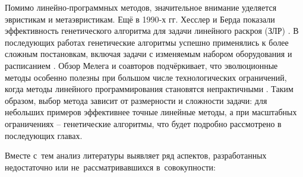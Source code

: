 Помимо линейно‑программных методов, значительное внимание уделяется эвристикам и метаэвристикам.
Ещё в 1990‑х гг.
Хесслер и Берда показали эффективность генетического алгоритма для задачи линейного раскроя (ЗЛР) \cite{haessler1991}.
В последующих работах генетические алгоритмы успешно применялись к более сложным постановкам, включая задачи с изменяемым набором оборудования и расписанием \cite{kureichik1998,genetics_2,evolution_1,semenkina2013}.
Обзор Мелега и соавторов подчёркивает, что эволюционные методы особенно полезны при большом числе технологических ограничений, когда методы линейного программирования становятся непрактичными \cite{melega2018review}.
Таким образом, выбор метода зависит от размерности и сложности задачи: для небольших примеров эффективнее точные линейные методы, а при масштабных ограничениях – генетические алгоритмы, что будет подробно рассмотрено в последующих главах.


Вместе с~тем анализ литературы выявляет ряд аспектов, разработанных недостаточно или не~рассматривавшихся в~совокупности:

